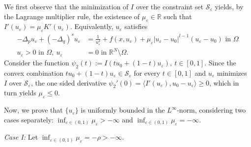 \documentclass[reqno,oneside]{amsart}
\theoremstyle{definition}
\theoremstyle{remark}
\numberwithin{equation}{section}
\newcommand{\Om} {\Omega}
\newcommand{\p}{\Delta_p}
\newcommand{\qs}{(-\Delta_q)^s}
\newcommand{\bdry}{\mathbb{R}^N \setminus \Omega}
\begin{document}
We first observe that the minimization of $I$ over the constraint set $\mathcal{S}_{\varepsilon}$ yields, by the Lagrange multiplier rule, the existence of $\mu_\varepsilon \in \mathbb{R}$ such that $I' (u_{\varepsilon})= \mu_{\varepsilon}K'(u_{\varepsilon})$. Equivalently, $u_{\varepsilon}$ satisfies
\begin{equation}\label{case 2 equation}
    \begin{aligned}
        -\p u_{\varepsilon} + \qs u_{\varepsilon} &= \frac{1}{u_{\varepsilon}^{\delta}} + f(x,u_{\varepsilon}) + \mu_{\varepsilon} |u_{\varepsilon} - u_0|^{l-1} (u_{\varepsilon} - u_0) \text{ in } \Om\\
        u_\varepsilon>0 \mbox{ in } \Omega,\ u_{\varepsilon} &= 0 \text{ in } \bdry.
    \end{aligned}
\end{equation}
Consider the function $\psi_2 (t):= I \left(tu_0 + (1-t)u_{\varepsilon} \right),\ t\in [0,1].$
Since the convex combination $tu_0 + (1-t)u_{\varepsilon} \in \mathcal{S}_{\varepsilon}$ for every $t\in [0,1]$ and $u_{\varepsilon}$ minimizes $I$ over $\mathcal{S}_{\varepsilon}$, the one sided derivative $\psi_2'(0) = \langle I' (u_{\varepsilon}), u_0 - u_{\varepsilon} \rangle \geq 0$, which in turn yields $\mu_{\varepsilon} \leq 0$.

Now, we prove that $\{u_\varepsilon\}$ is uniformly bounded in the $L^{\infty}$-norm, considering two cases separately: $\inf_{\varepsilon \in (0,1)} \mu_{\varepsilon} > -\infty$ and $\inf_{\varepsilon \in (0,1)} \mu_{\varepsilon} = -\infty$.
\vspace{5pt}

\noindent\textit{Case I:} Let $\displaystyle\inf_{\varepsilon \in (0,1)} \mu_{\varepsilon} = -\rho > -\infty$.
\vspace{5pt}
    
\end{document}

